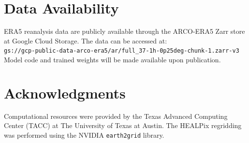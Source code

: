 \documentclass[11pt]{article}
\begin{document}
\section*{Data Availability}

ERA5 reanalysis data are publicly available through the ARCO-ERA5 Zarr store at Google Cloud Storage. The data can be accessed at:\\
\texttt{gs://gcp-public-data-arco-era5/ar/full\_37-1h-0p25deg-chunk-1.zarr-v3}\\
Model code and trained weights will be made available upon publication.

\section*{Acknowledgments}

Computational resources were provided by the Texas Advanced Computing Center (TACC) at The University of Texas at Austin. The HEALPix regridding was performed using the NVIDIA \texttt{earth2grid} library.


\end{document}
